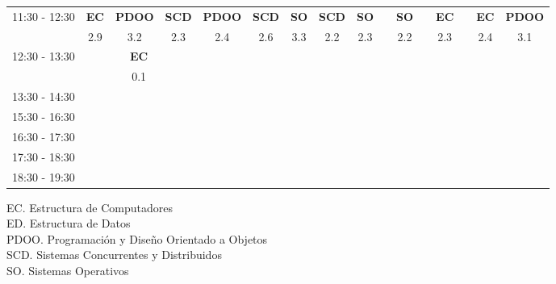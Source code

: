 \documentclass[10pt,spanish, landscape]{article}
\begin{document}
\begin{minipage}{0.7\textwidth}
\begin{tabular}{|c|ccc|ccc|ccc|ccc|ccc|}
 \hline
\multirow{2}{*}{11:30 - 12:30}  & \textbf{EC} & \textbf{PDOO} & \textbf{SCD} & \textbf{PDOO} & \textbf{SCD} & \textbf{SO} & \textbf{SCD} & \textbf{SO} & \textbf{} & \textbf{SO} & \textbf{} & \textbf{EC} & \textbf{} & \textbf{EC} & \textbf{PDOO}\\ 
 & {\footnotesize 2.9} & {\footnotesize 3.2} & {\footnotesize 2.3} & {\footnotesize 2.4} & {\footnotesize 2.6} & {\footnotesize 3.3} & {\footnotesize 2.2} & {\footnotesize 2.3} & {\footnotesize } & {\footnotesize 2.2} & {\footnotesize } & {\footnotesize 2.3} & {\footnotesize } & {\footnotesize 2.4} & {\footnotesize 3.1}\\ 
 \hline
\multirow{2}{*}{12:30 - 13:30} & \multicolumn{3}{|c|}{ \cellcolor{grisclaro} \textbf{EC}} &  &  &  &  &  &  &  &  &  &  &  & \\ 
& \multicolumn{3}{|c|}{ \cellcolor{grisclaro} {\footnotesize 0.1}} &  &  &  &  &  &  &  &  &  &  &  & \\ 
 \hline
\multirow{2}{*}{13:30 - 14:30}  &  &  &  &  &  &  &  &  &  &  &  &  &  &  & \\ 
 &  &  &  &  &  &  &  &  &  &  &  &  &  &  & \\ 
 \hline
\multirow{2}{*}{15:30 - 16:30}  &  &  &  &  &  &  &  &  &  &  &  &  &  &  & \\ 
 &  &  &  &  &  &  &  &  &  &  &  &  &  &  & \\ 
 \hline
\multirow{2}{*}{16:30 - 17:30}  &  &  &  &  &  &  &  &  &  &  &  &  &  &  & \\ 
 &  &  &  &  &  &  &  &  &  &  &  &  &  &  & \\ 
 \hline
\multirow{2}{*}{17:30 - 18:30}  &  &  &  &  &  &  &  &  &  &  &  &  &  &  & \\ 
 &  &  &  &  &  &  &  &  &  &  &  &  &  &  & \\ 
 \hline
\multirow{2}{*}{18:30 - 19:30}  &  &  &  &  &  &  &  &  &  &  &  &  &  &  & \\ 
 &  &  &  &  &  &  &  &  &  &  &  &  &  &  & \\ 
 \hline

\end{tabular}
\end{minipage}
\begin{minipage}{0.25\textwidth}
EC. Estructura de Computadores\\[0.5cm]
ED. Estructura de Datos\\[0.5cm]
PDOO. Programación y Diseño Orientado a Objetos\\[0.5cm]
SCD. Sistemas Concurrentes y Distribuidos\\[0.5cm]
SO. Sistemas Operativos\\[0.5cm]
\end{minipage}
\newpage
\end{document}
